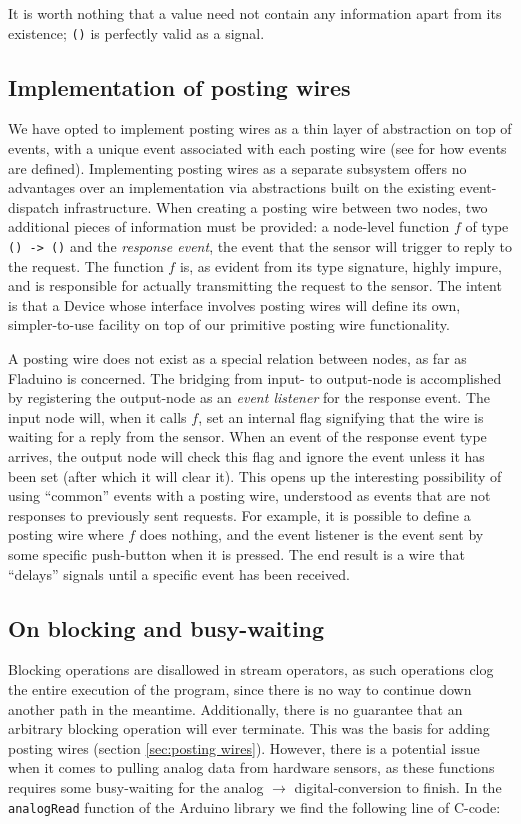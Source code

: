 \documentclass[a4paper, oneside, final]{memoir}
\let\Fref\undefined
\begin{document}
It is worth nothing that a value need not contain any information
apart from its existence; \texttt{()} is perfectly valid as a signal.

\subsection{Implementation of posting wires}
\label{sec:postingwireimpl}
We have opted to implement posting wires as a thin layer of
abstraction on top of events, with a unique event associated with each
posting wire (see \Fref{sec:defining events} for how events are
defined).  Implementing posting wires as a separate subsystem offers
no advantages over an implementation via abstractions built on the
existing event-dispatch infrastructure.  When creating a posting wire
between two nodes, two additional pieces of information must be
provided: a node-level function $f$ of type \texttt{() -> ()} and the
\textit{response event}, the event that the sensor will trigger to
reply to the request.  The function $f$ is, as evident from its type
signature, highly impure, and is responsible for actually transmitting
the request to the sensor.  The intent is that a Device whose
interface involves posting wires will define its own, simpler-to-use
facility on top of our primitive posting wire functionality.

A posting wire does not exist as a special relation between nodes, as
far as Fladuino is concerned.  The bridging from input- to output-node
is accomplished by registering the output-node as an \textit{event
  listener} for the response event.  The input node will, when it
calls $f$, set an internal flag signifying that the wire is waiting
for a reply from the sensor.  When an event of the response event type
arrives, the output node will check this flag and ignore the event
unless it has been set (after which it will clear it).  This opens up
the interesting possibility of using ``common'' events with a posting
wire, understood as events that are not responses to previously sent
requests.  For example, it is possible to define a posting wire where
$f$ does nothing, and the event listener is the event sent by some
specific push-button when it is pressed.  The end result is a wire
that ``delays'' signals until a specific event has been received.

\subsection{On blocking and busy-waiting}
Blocking operations are disallowed in stream operators, as such
operations clog the entire execution of the program, since there is no
way to continue down another path in the meantime.  Additionally,
there is no guarantee that an arbitrary blocking operation will ever
terminate.  This was the basis for adding posting wires (section
\ref{sec:posting wires}). However, there is a potential issue when it
comes to pulling analog data from hardware sensors, as these functions
requires some busy-waiting for the analog $\rightarrow$
digital-conversion to finish.  In the \texttt{analogRead} function of
the Arduino library we find the following line of C-code:
\end{document}
